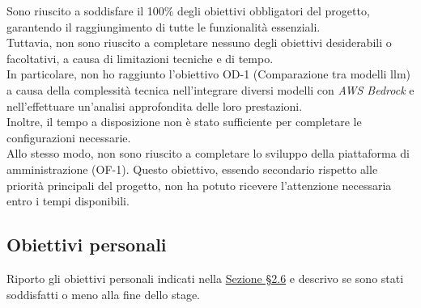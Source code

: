 \noindent Sono riuscito a soddisfare il 100\% degli obiettivi obbligatori del progetto, garantendo il raggiungimento di tutte le funzionalità essenziali. \\
Tuttavia, non sono riuscito a completare nessuno degli obiettivi desiderabili o facoltativi, a causa di limitazioni tecniche e di tempo.\\

\noindent In particolare, non ho raggiunto l'obiettivo OD-1 (Comparazione tra modelli \gls{llm}) a causa della complessità tecnica nell'integrare diversi modelli con \textit{AWS Bedrock} e nell'effettuare un'analisi approfondita delle loro prestazioni.\\
Inoltre, il tempo a disposizione non è stato sufficiente per completare le configurazioni necessarie.\\

\noindent Allo stesso modo, non sono riuscito a completare lo sviluppo della piattaforma di amministrazione (OF-1).
Questo obiettivo, essendo secondario rispetto alle priorità principali del progetto, non ha potuto ricevere l’attenzione necessaria entro i tempi disponibili.
\pagebreak
\subsection{Obiettivi personali}
\label{subsec:raggiungimento-obiettivi-personali}

Riporto gli obiettivi personali indicati nella \hyperref[sez:obiettivi-personali]{Sezione §2.6} e descrivo se sono stati soddisfatti o meno alla fine dello stage.\\

\renewcommand{\arraystretch}{1.5} %

